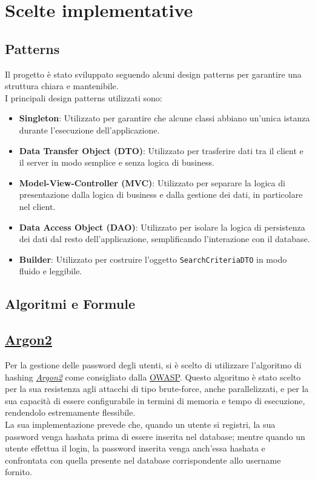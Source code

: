 \section{Scelte implementative}

\subsection{Patterns}
Il progetto è stato sviluppato seguendo alcuni design patterns
per garantire una struttura chiara e mantenibile.\\
I principali
design patterns utilizzati sono:
\begin{itemize}
    \item \textbf{Singleton}: Utilizzato per garantire che alcune 
    classi abbiano un'unica istanza durante l'esecuzione dell'applicazione.
    \item \textbf{Data Transfer Object (DTO)}: Utilizzato per
    trasferire dati tra il client e il server in modo semplice e
    senza logica di business.
    \item \textbf{Model-View-Controller (MVC)}: Utilizzato per
    separare la logica di presentazione dalla logica di business
    e dalla gestione dei dati, in particolare nel client.
    \item \textbf{Data Access Object (DAO)}: Utilizzato per isolare
    la logica di persistenza dei dati dal resto dell'applicazione,
    semplificando l'interazione con il database.
    \item \textbf{Builder}: Utilizzato per costruire l'oggetto \texttt{SearchCriteriaDTO} in modo fluido e leggibile.
\end{itemize}

\subsection{Algoritmi e Formule}

\subsection{\href{https://github.com/p-h-c/phc-winner-argon2}{Argon2}}
Per la gestione delle password degli utenti, si è scelto di utilizzare
l'algoritmo di hashing \href{https://github.com/p-h-c/phc-winner-argon2}{\textit{Argon2}} come consigliato dalla
\href{https://owasp.org}{OWASP}.
Questo algoritmo è stato scelto per la sua resistenza agli attacchi 
di tipo brute-force, anche parallelizzati, e per la sua capacità di essere configurabile
in termini di memoria e tempo di esecuzione, rendendolo estremamente flessibile.\\
La sua implementazione prevede che, quando un utente si registri, 
la sua password venga hashata prima di essere inserita nel database;
mentre quando un utente effettua il login, la password inserita
venga anch'essa hashata e confrontata con quella presente nel database
corrispondente allo username fornito.

